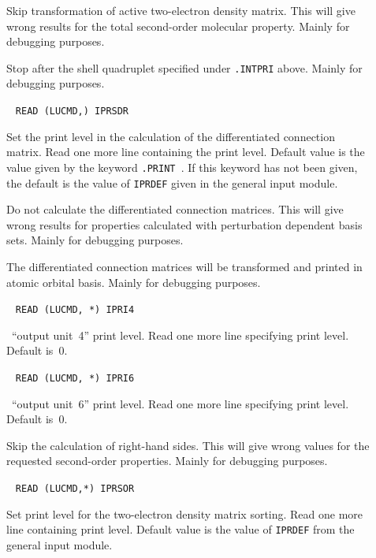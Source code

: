\begin{description}
\item[] Skip transformation of active two-electron
density matrix. This will give wrong results for the total
second-order molecular property. Mainly for debugging purposes.

\item[] Stop after the shell quadruplet specified
under \verb|.INTPRI| above. Mainly for debugging purposes.

\item[]\verb| |\newline
\verb|READ (LUCMD,) IPRSDR|

Set the print level in the calculation of the differentiated connection
matrix. Read one more line containing the print level. Default
value is the value given by the keyword \verb|.PRINT |. If this
keyword has not been given, the default is the value of \verb|IPRDEF|
given in the general input module.

\item[] Do not calculate the differentiated connection
matrices. This will give wrong results for properties calculated with
perturbation dependent basis sets. Mainly for debugging purposes.

\item[] The differentiated connection matrices will be
transformed and printed in atomic orbital basis. Mainly for debugging
purposes.

\item[]\verb| |\newline
\verb|READ (LUCMD, *) IPRI4|

\sir\  ``output unit~4'' print level.  Read one more line specifying
print level. Default is~0.

\item[]\verb| |\newline
\verb|READ (LUCMD, *) IPRI6|

\sir\ ``output unit~6'' print level.  Read one more line specifying
print level. Default is~0.

\item[] Skip the calculation of right-hand sides. This
will give wrong values for the requested second-order properties.
Mainly for debugging purposes.

\item[]\verb| |\newline
\verb|READ (LUCMD,*) IPRSOR|

Set print level for the two-electron density matrix sorting. Read one
more line containing print level. Default value is the value of
\verb|IPRDEF| from the general input module.


\end{description}
